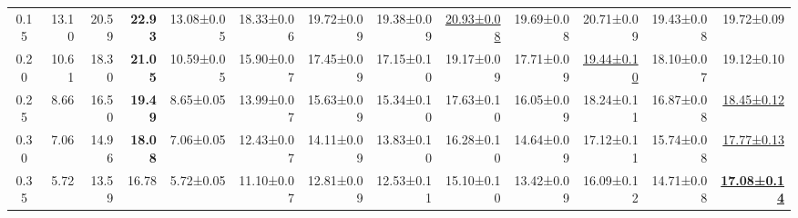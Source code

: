 \documentclass[a4paper, 12pt]{article}
\begin{document}
\begin{table}[H]
{\begin{tabular}{@{}crrrrrrrrrrrr@{}}
			0.15        & 13.10                                      & 20.59                                                                    & \textbf{22.93}                        & 13.08±0.05                    & 18.33±0.06                            & 19.72±0.09                            & 19.38±0.09                            & \underline{20.93±0.08}                & 19.69±0.08                            & 20.71±0.09                            & 19.43±0.08                            & 19.72±0.09                            \\
			0.20        & 10.61                                      & 18.30                                                                    & \textbf{21.05}                        & 10.59±0.05                    & 15.90±0.07                            & 17.45±0.09                            & 17.15±0.10                            & 19.17±0.09                            & 17.71±0.09                            & \underline{19.44±0.10}                & 18.10±0.07                            & 19.12±0.10                            \\
			0.25        & 8.66                                       & 16.50                                                                    & \textbf{19.49}                        & 8.65±0.05                     & 13.99±0.07                            & 15.63±0.09                            & 15.34±0.10                            & 17.63±0.10                            & 16.05±0.09                            & 18.24±0.11                            & 16.87±0.08                            & \underline{18.45±0.12}                \\
			0.30        & 7.06                                       & 14.96                                                                    & \textbf{18.08}                        & 7.06±0.05                     & 12.43±0.07                            & 14.11±0.09                            & 13.83±0.10                            & 16.28±0.10                            & 14.64±0.09                            & 17.12±0.11                            & 15.74±0.08                            & \underline{17.77±0.13}                \\
			0.35        & 5.72                                       & 13.59                                                                    & 16.78                                 & 5.72±0.05                     & 11.10±0.07                            & 12.81±0.09                            & 12.53±0.11                            & 15.10±0.10                            & 13.42±0.09                            & 16.09±0.12                            & 14.71±0.08                            & \underline{\textbf{17.08±0.14}}       \\

\end{tabular}}
\end{table}
\end{document}
